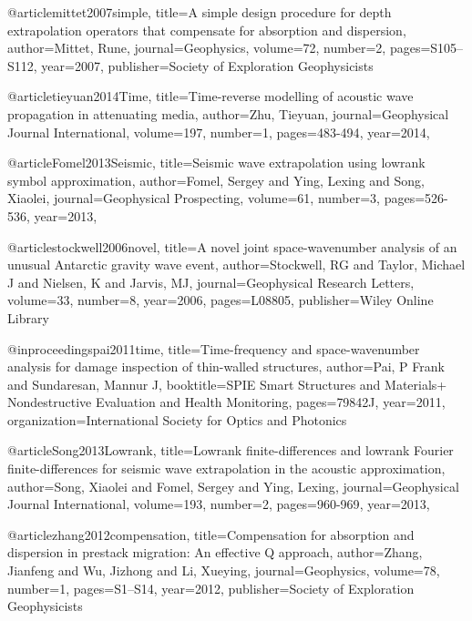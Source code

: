 {@article{mittet2007simple,
  title={A simple design procedure for depth extrapolation operators that compensate for absorption and dispersion},
  author={Mittet, Rune},
  journal={Geophysics},
  volume={72},
  number={2},
  pages={S105--S112},
  year={2007},
  publisher={Society of Exploration Geophysicists}
}

@article{tieyuan2014Time,
  title={Time-reverse modelling of acoustic wave propagation in attenuating media},
  author={Zhu, Tieyuan},
  journal={Geophysical Journal International},
  volume={197},
  number={1},
  pages={483-494},
  year={2014},
}

@article{Fomel2013Seismic,
  title={Seismic wave extrapolation using lowrank symbol approximation},
  author={Fomel, Sergey and Ying, Lexing and Song, Xiaolei},
  journal={Geophysical Prospecting},
  volume={61},
  number={3},
  pages={526-536},
  year={2013},
}

@article{stockwell2006novel,
  title={A novel joint space-wavenumber analysis of an unusual Antarctic gravity wave event},
  author={Stockwell, RG and Taylor, Michael J and Nielsen, K and Jarvis, MJ},
  journal={Geophysical Research Letters},
  volume={33},
  number={8},
  year={2006},
  pages={L08805},
  publisher={Wiley Online Library}
}

@inproceedings{pai2011time,
  title={Time-frequency and space-wavenumber analysis for damage inspection of thin-walled structures},
  author={Pai, P Frank and Sundaresan, Mannur J},
  booktitle={SPIE Smart Structures and Materials+ Nondestructive Evaluation and Health Monitoring},
  pages={79842J},
  year={2011},
  organization={International Society for Optics and Photonics}
}


@article{Song2013Lowrank,
  title={Lowrank finite-differences and lowrank {F}ourier finite-differences for seismic wave extrapolation in the acoustic approximation},
  author={Song, Xiaolei and Fomel, Sergey and Ying, Lexing},
  journal={Geophysical Journal International},
  volume={193},
  number={2},
  pages={960-969},
  year={2013},
}

@article{zhang2012compensation,
  title={Compensation for absorption and dispersion in prestack migration: {A}n effective {Q} approach},
  author={Zhang, Jianfeng and Wu, Jizhong and Li, Xueying},
  journal={Geophysics},
  volume={78},
  number={1},
  pages={S1--S14},
  year={2012},
  publisher={Society of Exploration Geophysicists}
}

}
